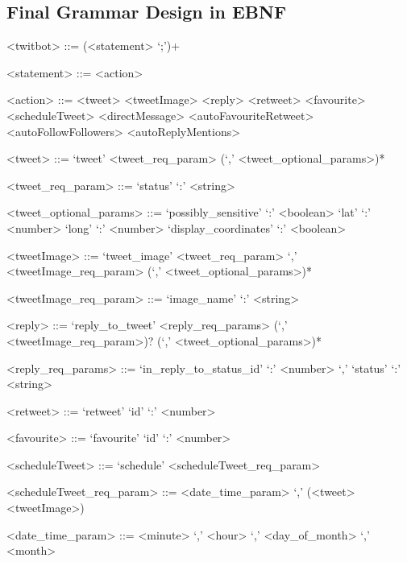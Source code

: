 \setlength{\grammarparsep}{2pt plus 1pt minus 1pt} %
\setlength{\grammarindent}{15em} %

\begin{appendices}

\chapter{Final Grammar Design in EBNF}

\begin{grammar}
<twitbot> ::= (<statement> `;')+ 

<statement> ::= <action> 

<action> ::= <tweet>
\alt <tweetImage>
\alt <reply>
\alt <retweet>
\alt <favourite>
\alt <scheduleTweet>
\alt <directMessage>
\alt <autoFavouriteRetweet>
\alt <autoFollowFollowers>
\alt <autoReplyMentions>

<tweet> ::= `tweet' <tweet_req_param> \newline (`,' <tweet_optional_params>)*

<tweet_req_param> ::= `status' `:' <string>

<tweet_optional_params> ::= `possibly_sensitive' `:' <boolean>
\alt `lat' `:' <number>
\alt `long' `:' <number>
\alt `display_coordinates' `:' <boolean>

<tweetImage> ::= `tweet_image' <tweet_req_param> \newline `,' <tweetImage_req_param> \newline (`,' <tweet_optional_params>)*

<tweetImage_req_param> ::= `image_name' `:' <string>

<reply> ::= `reply_to_tweet' <reply_req_params> \newline (`,' <tweetImage_req_param>)? \newline (`,' <tweet_optional_params>)*

<reply_req_params> ::= `in_reply_to_status_id' `:' <number> `,' \newline `status' `:' <string>

<retweet> ::= `retweet' `id' `:' <number>

<favourite> ::= `favourite' `id' `:' <number>

<scheduleTweet> ::= `schedule' <scheduleTweet_req_param>

<scheduleTweet_req_param> ::= <date_time_param> `,' (<tweet> \alt <tweetImage>)

<date_time_param> ::= <minute> `,' <hour> `,' <day_of_month> `,' <month>


\end{grammar}
\end{appendices}
